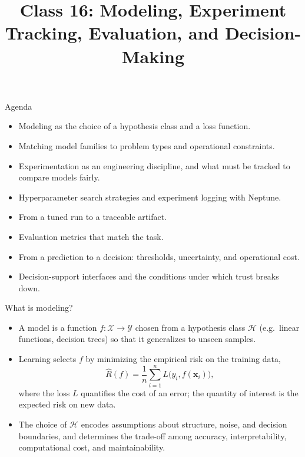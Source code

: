 
\usepackage{amssymb}

\title{Class 16: Modeling, Experiment Tracking, Evaluation, and Decision-Making}
\author{\coursename}
\date{}



\frame{\titlepage \coursefooter}

\begin{frame}{Agenda}
\begin{itemize}
\item Modeling as the choice of a hypothesis class and a loss function.
\item Matching model families to problem types and operational constraints.
\item Experimentation as an engineering discipline, and what must be tracked to compare models fairly.
\item Hyperparameter search strategies and experiment logging with Neptune.
\item From a tuned run to a traceable artifact.
\item Evaluation metrics that match the task.
\item From a prediction to a decision: thresholds, uncertainty, and operational cost.
\item Decision-support interfaces and the conditions under which trust breaks down.
\end{itemize}
\coursefooter
\end{frame}

\begin{frame}{What is modeling?}
\begin{itemize}
\item A model is a function $f: \mathcal{X} \to \mathcal{Y}$ chosen from a hypothesis class $\mathcal{H}$ (e.g.\ linear functions, decision trees) so that it generalizes to unseen samples.
\item Learning selects $f$ by minimizing the empirical risk on the training data,
\[
\hat{R}(f) = \frac{1}{n}\sum_{i=1}^{n} L\big(y_i, f(\mathbf{x}_i)\big),
\]
where the loss $L$ quantifies the cost of an error; the quantity of interest is the expected risk on new data.
\item The choice of $\mathcal{H}$ encodes assumptions about structure, noise, and decision boundaries, and determines the trade-off among accuracy, interpretability, computational cost, and maintainability.
\end{itemize}
\coursefooter
\end{frame}

